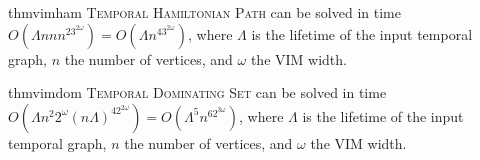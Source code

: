 \documentclass[a4paper,UKenglish,cleveref, autoref, thm-restate]{lipics-v2021} %
\DeclareMathOperator{\visited}{\textit{visited}}
\DeclareMathOperator{\unvisited}{\textit{unvisited}}
\DeclareMathOperator{\current}{\textit{current}}
\begin{document}
\begin{restatable}{thm}{vimham}\label{thm:vim-ham}
    \textsc{Temporal Hamiltonian Path} can be solved in time $
    O(\Lambda nnn^23^{2\omega})=
    O(\Lambda n^43^{2\omega})$, where $\Lambda$ is the lifetime of the input temporal graph, $n$ the number of vertices, and $\omega$ the VIM width.
\end{restatable}

\begin{restatable}{thm}{vimdom}\label{thm:vim-dom}
    \textsc{Temporal Dominating Set} can be solved in time $O(\Lambda n^2 2^{\omega}(n\Lambda)^42^{2\omega})=O(\Lambda^5 n^62^{3\omega})$, where $\Lambda$ is the lifetime of the input temporal graph, $n$ the number of vertices, and $\omega$ the VIM width.
\end{restatable}




\end{document}
